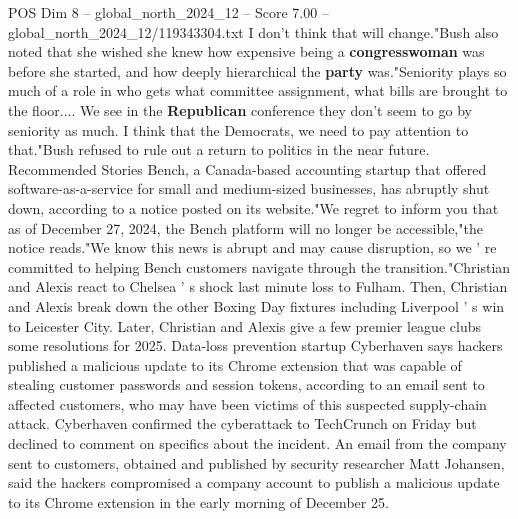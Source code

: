 \begin{textsample}{POS Dim 8 – global\_north\_2024\_12 – Score 7.00 – global\_north\_2024\_12/119343304.txt}
I don't think that will change."Bush also noted that she wished she knew how expensive being a \textbf{congresswoman} was before she started, and how deeply hierarchical the \textbf{party} was."Seniority plays so much of a role in who gets what committee assignment, what bills are brought to the floor....
We see in the \textbf{Republican} conference they don't seem to go by seniority as much.
I think that the Democrats, we need to pay attention to that."Bush refused to rule out a return to politics in the near future.
Recommended Stories Bench, a Canada-based accounting startup that offered software-as-a-service for small and medium-sized businesses, has abruptly shut down, according to a notice posted on its website."We regret to inform you that as of December 27, 2024, the Bench platform will no longer be accessible,"the notice reads."We know this news is abrupt and may cause disruption, so we ' re committed to helping Bench customers navigate through the transition."Christian and Alexis react to Chelsea ' s shock last minute loss to Fulham.
Then, Christian and Alexis break down the other Boxing Day fixtures including Liverpool ' s win to Leicester City.
Later, Christian and Alexis give a few premier league clubs some resolutions for 2025.
Data-loss prevention startup Cyberhaven says hackers published a malicious update to its Chrome extension that was capable of stealing customer passwords and session tokens, according to an email sent to affected customers, who may have been victims of this suspected supply-chain attack.
Cyberhaven confirmed the cyberattack to TechCrunch on Friday but declined to comment on specifics about the incident.
An email from the company sent to customers, obtained and published by security researcher Matt Johansen, said the hackers compromised a company account to publish a malicious update to its Chrome extension in the early morning of December 25.

\end{textsample}
